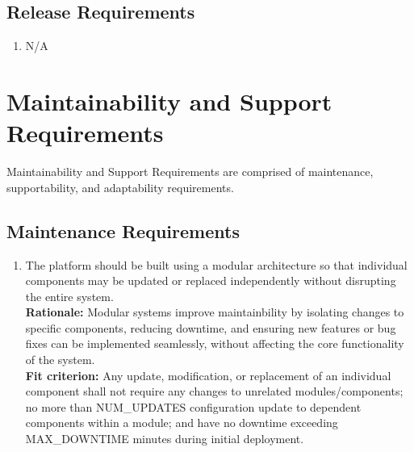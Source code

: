 \documentclass[12pt]{article}
\begin{document}
\subsection{Release Requirements}
\begin{enumerate}[label={OE-RR\arabic*}. ]
  \item N/A
\end{enumerate}

\newpage

\section{Maintainability and Support Requirements}
\hspace{2em}Maintainability and Support Requirements are comprised of maintenance, supportability, and adaptability requirements.
\subsection{Maintenance Requirements}
\begin{enumerate}[label={MS-MR}1. ]
  \item The platform should be built using a modular architecture so that individual components may be updated or replaced independently without disrupting the entire system.\\
  \textbf{Rationale: }Modular systems improve maintainbility by isolating changes to specific components, reducing downtime, and ensuring new features or bug fixes can be implemented seamlessly, without affecting the core functionality of the system.\\
  \textbf{Fit criterion: }Any update, modification, or replacement of an individual component shall not require any changes to unrelated modules/components; no more than NUM\_UPDATES configuration update to dependent components within a module; and have no downtime exceeding MAX\_DOWNTIME minutes during initial deployment.
\end{enumerate}
\end{document}
